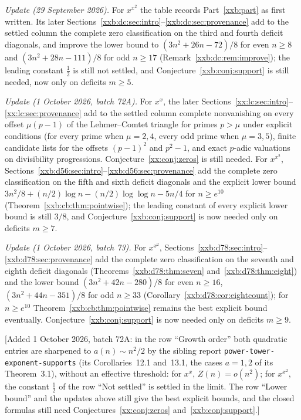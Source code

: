 \documentclass[11pt,a4paper]{article}
\numberwithin{equation}{section}
\theoremstyle{definition}
\theoremstyle{remark}
\theoremstyle{plain}
\newcommand{\sibPTE}{\texttt{power-\allowbreak{}tower-\allowbreak{}exponent-\allowbreak{}supports}}
\begin{document}
\emph{Update (29 September 2026).}  For $x^{x^2}$ the table records Part~\ref{xxb:part}
as first written.  Its later Sections~\ref{xxb:dc:sec:intro}--\ref{xxb:dc:sec:provenance}
add to the settled column the complete zero classification on the third and
fourth deficit diagonals, and improve the lower bound to $(3n^2+26n-72)/8$ for
even $n\ge8$ and $(3n^2+28n-111)/8$ for odd $n\ge17$
(Remark~\ref{xxb:dc:rem:improve}); the leading constant $\tfrac12$ is still not
settled, and Conjecture~\ref{xxb:conj:support} is still needed, now only on
deficits $m\ge5$.

\emph{Update (1 October 2026, batch 72A).}  For $x^x$, the later
Sections~\ref{xx:lc:sec:intro}--\ref{xx:lc:sec:provenance} add to the settled
column complete nonvanishing on every offset $\mu(p-1)$ of the Lehmer--Comtet
triangle for primes $p>\mu$ under explicit conditions (for every prime when
$\mu=2,4$, every odd prime when $\mu=3,5$), finite candidate lists for the
offsets $(p-1)^2$ and $p^2-1$, and exact $p$-adic valuations on divisibility
progressions.  Conjecture~\ref{xx:conj:zeros} is still needed.  For
$x^{x^2}$, Sections~\ref{xxb:d56:sec:intro}--\ref{xxb:d56:sec:provenance} add
the complete zero classification on the fifth and sixth deficit diagonals and
the explicit lower bound $3n^2/8+(n/2)\log n-(n/2)\log\log n-5n/4$ for
$n\ge e^{10}$ (Theorem~\ref{xxb:cb:thm:pointwise}); the leading constant of
every explicit lower bound is still $3/8$, and
Conjecture~\ref{xxb:conj:support} is now needed only on deficits $m\ge7$.

\emph{Update (1 October 2026, batch 73).}  For $x^{x^2}$,
Sections~\ref{xxb:d78:sec:intro}--\ref{xxb:d78:sec:provenance} add the
complete zero classification on the seventh and eighth deficit diagonals
(Theorems~\ref{xxb:d78:thm:seven} and~\ref{xxb:d78:thm:eight}) and the lower
bound $(3n^2+42n-280)/8$ for even $n\ge16$, $(3n^2+44n-351)/8$ for odd
$n\ge33$ (Corollary~\ref{xxb:d78:cor:eightcount}); for $n\ge e^{10}$
Theorem~\ref{xxb:cb:thm:pointwise} remains the best explicit bound eventually.
Conjecture~\ref{xxb:conj:support} is now needed only on deficits $m\ge9$.

[Added 1 October 2026, batch 72A: in the row ``Growth order'' both quadratic entries are
sharpened to $a(n)\sim n^2/2$ by the sibling report \sibPTE{} (its
Corollaries~12.1 and~13.1, the cases $a=1,2$ of its Theorem~3.1), without an
effective threshold: for $x^x$, $Z(n)=o(n^2)$; for $x^{x^2}$, the constant
$\tfrac12$ of the row ``Not settled'' is settled in the limit.  The row
``Lower bound'' and the updates above still give the best explicit bounds, and
the closed formulas still need Conjectures~\ref{xx:conj:zeros}
and~\ref{xxb:conj:support}.]
\end{document}
